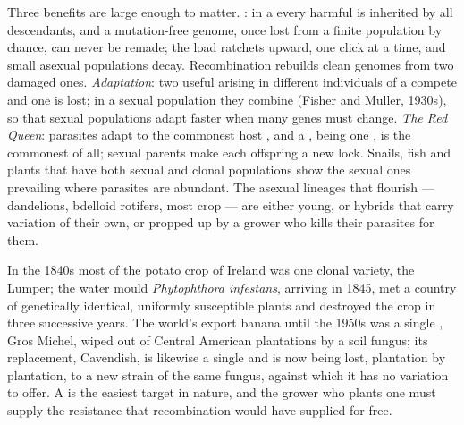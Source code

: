 \begin{proposition}\label{prop:b2:asexual-reproduction:whysex}
Three benefits are large enough to matter. \emph{}:
in a  every harmful  is inherited by all descendants,
and a mutation-free genome, once lost from a finite population by
chance, can never be remade; the load ratchets upward, one click at
a time, and small asexual populations decay. Recombination rebuilds
clean genomes from two damaged ones. \emph{Adaptation}: two useful
 arising in different individuals of a  compete and
one is lost; in a sexual population they combine (Fisher and Muller,
1930s), so that sexual populations adapt faster when many genes must
change. \emph{The Red Queen}: parasites adapt to the commonest host
, and a , being one , is the commonest of all;
sexual parents make each offspring a new lock. Snails, fish and
plants that have both sexual and clonal populations show the
sexual ones prevailing where parasites are abundant. The asexual
lineages that flourish --- dandelions, bdelloid rotifers, most crop
 --- are either young, or  hybrids that carry
variation of their own, or propped up by a grower who kills their
parasites for them.
\end{proposition}

\begin{example}\label{ex:b2:asexual-reproduction:monoculture}
In the 1840s most of the potato crop of Ireland was one clonal
variety, the Lumper; the water mould \emph{Phytophthora infestans},
arriving in 1845, met a country of genetically identical, uniformly
susceptible plants and destroyed the crop in three successive years.
The world's export banana until the 1950s was a single , Gros
Michel, wiped out of Central American plantations by a soil fungus;
its replacement, Cavendish, is likewise a single  and is now
being lost, plantation by plantation, to a new strain of the same
fungus, against which it has no variation to offer. A  is the
easiest target in nature, and the grower who plants one must supply
the resistance that recombination would have supplied for free.
\end{example}

